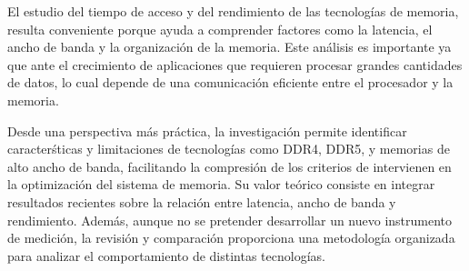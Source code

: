 El estudio del tiempo de acceso y del rendimiento de las tecnologías de memoria,
resulta conveniente porque ayuda a comprender factores como la latencia, el 
ancho de banda y la organización de la memoria. Este análisis es importante
ya que ante el crecimiento de aplicaciones que requieren procesar grandes 
cantidades de datos, lo cual depende de una comunicación eficiente entre el 
procesador y la memoria.

Desde una perspectiva más práctica, la investigación permite identificar caracterśticas 
y limitaciones de tecnologías como DDR4, DDR5, y memorias de alto ancho de banda, facilitando
la compresión de los criterios de intervienen en la optimización del sistema de memoria.
Su valor teórico consiste en integrar resultados recientes sobre la relación entre latencia,
ancho de banda y rendimiento. Además, aunque no se pretender desarrollar un nuevo instrumento 
de medición, la revisión y comparación proporciona una metodología organizada para analizar
el comportamiento de distintas tecnologías.